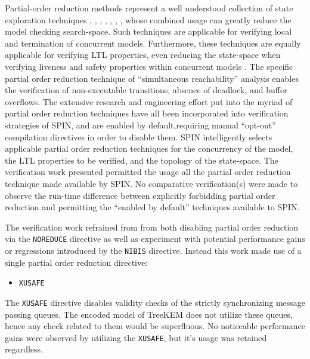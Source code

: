 Partial-order reduction methods represent a well understood collection of state exploration techniques \autocite{godefroid1990using}, \autocite{godefroid1991using}, \autocite{godefroid1994partial}, \autocite{holzmann1995improvement}, \autocite{katz1992verification}, \autocite{peled1993all}, \autocite{valmari1989stubborn}, \autocite{valmari1992stubborn} whose combined usage can greatly reduce the model checking search-space.
Such techniques are applicable for verifying local and termination of concurrent models.
Furthermore, these techniques are equally applicable for verifying LTL properties, even reducing the state-space when verifying liveness and safety properties within concurrent models \autocite{wolper1983reasoning}.
The specific partial order reduction technique of ``simultaneous reachability'' analysis \autocite{van1997partial} enables the verification of non-executable transitions, absence of deadlock, and buffer overflows.
The extensive research and engineering effort put into the myriad of partial order reduction techniques have all been incorporated into verification strategies of SPIN, and are enabled by default,requiring manual ``opt-out'' compilation directives in order to disable them.
SPIN intelligently selects applicable partial order reduction techniques for the concurrency of the model, the LTL properties to be verified, and the topology of the state-space.
The verification work presented permitted the usage all the partial order reduction technique made available by SPIN.
No comparative verification(s) were made to observe the run-time difference between explicitly forbidding partial order reduction and permitting the ``enabled by default'' techniques available to SPIN.

The verification work refrained from from both disabling partial order reduction via the \texttt{NOREDUCE} directive as well as experiment with potential performance gains or regressions introduced by the \texttt{NIBIS} directive.
Instead this work made use of a single partial order reduction directive:

\begin{itemize}
\item
  \texttt{XUSAFE}
\end{itemize}

The \texttt{XUSAFE} directive disables validity checks of the strictly synchronizing message passing queues.
The encoded model of TreeKEM does not utilize these queues, hence any check related to them would be superfluous.
No noticeable performance gains were observed by utilizing the \texttt{XUSAFE}, but it's usage was retained regardless.

